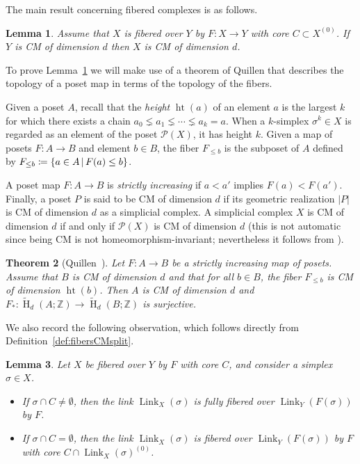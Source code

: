 \documentclass[11 pt]{article}
\theoremstyle{plain}
\newtheorem{theorem}{Theorem}[section]
\newtheorem{lemma}[theorem]{Lemma}
\theoremstyle{definition}
\numberwithin{equation}{section}
\newcommand\Z{\ensuremath{\mathbb{Z}}}
\DeclareMathOperator{\HH}{H}
\DeclareMathOperator{\Link}{Link}
\newcommand\Poset{\ensuremath{\mathcal{P}}}
\DeclareMathOperator{\height}{ht}
\newcommand\coloneq{\mathrel{\mathop:}\mkern-1.2mu=}
\newcommand\abs[1]{\left\lvert#1\right\rvert}
\begin{document}
The main result concerning fibered complexes is as follows.

\begin{lemma}
\label{lemma:fibersCMsplit}
Assume that $X$ is fibered over $Y$ by $F\colon X\to Y$ with core $C\subset X^{(0)}$. If $Y$ is CM of dimension $d$ then $X$ is CM of dimension $d$.
\end{lemma}

To prove Lemma~\ref{lemma:fibersCMsplit} we will make use of a theorem of Quillen that describes the topology of a poset map in terms of the topology of the fibers.

Given a poset $A$, recall that the \emph{height} $\height(a)$ of an element $a$
is the largest $k$ for which there exists a chain $a_0\lneq a_1\lneq \cdots \lneq a_k=a$. 
When a $k$-simplex $\sigma^k\in X$ is regarded as an element of the poset $\Poset(X)$, it has height $k$.
Given a map of posets $F\colon A\to B$ and element $b\in B$, the fiber $F_{\leq b}$ 
is the subposet of $A$ defined by $F_{\leq b}\coloneq \{a\in A \,|\, F(a)\leq b\}$.
 
A poset map $F\colon A\to B$ is {\em strictly increasing} if $a<a'$ implies $F(a)<F(a')$.
Finally, a poset $P$ is said to be CM of dimension $d$ if its geometric realization $\abs{P}$ is CM of dimension $d$ as a simplicial complex.  A simplicial complex $X$ is CM of dimension $d$ if and only if $\Poset(X)$ is CM of dimension $d$ (this is not automatic since being CM is not homeomorphism-invariant; nevertheless it follows from \cite[(8.5)]{QuillenPoset}). 

\begin{theorem}[{Quillen~\cite[Theorem 9.1, Corollary 9.7]{QuillenPoset}}]
\label{theorem:quillen}
Let $F\colon A\to B$ be a strictly increasing map of posets.  Assume that $B$ 
is CM of dimension $d$ and that for all $b\in B$, the fiber $F_{\leq b}$ 
is CM of dimension $\height(b)$.  Then $A$ is CM of dimension $d$ and $F_{\ast}\colon \widetilde{\HH}_d(A;\Z)\to \widetilde{\HH}_d(B;\Z)$ is surjective.
\end{theorem}

We also record the following observation, which follows directly from Definition~\ref{def:fibersCMsplit}.
\begin{lemma}
\label{lemma:linksfibered}
Let  $X$ be fibered over $Y$ by $F$ with core $C$, and consider a simplex $\sigma\in X$. 
\begin{itemize}[nosep]
\item If $\sigma\cap C\neq \emptyset$, then the link $\Link_X(\sigma)$ is fully fibered over $\Link_Y(F(\sigma))$ by $F$.
\item If $\sigma\cap C=\emptyset$, then the link $\Link_X(\sigma)$ is fibered over $\Link_Y(F(\sigma))$ by $F$ 
with core $C\cap \Link_X(\sigma)^{(0)}$.
\end{itemize}
\end{lemma}
\end{document}

